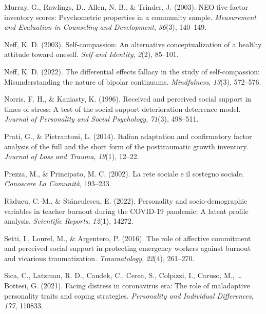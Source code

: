 \documentclass[
  man]{apa6}
\newlength{\cslhangindent}
\newlength{\cslentryspacingunit} %
\newenvironment{CSLReferences}[2] %
 {%
  \setlength{\parindent}{0pt}
  \ifodd #1
  \let\oldpar\par
  \def\par{\hangindent=\cslhangindent\oldpar}
  \fi
  \setlength{\parskip}{#2\cslentryspacingunit}
 }%
 {}
\begin{document}
\begin{CSLReferences}{1}{0}
\leavevmode{}%
Murray, G., Rawlings, D., Allen, N. B., \& Trinder, J. (2003). NEO five-factor inventory scores: Psychometric properties in a community sample. \emph{Measurement and Evaluation in Counseling and Development}, \emph{36}(3), 140--149.

\leavevmode{}%
Neff, K. D. (2003). Self-compassion: An alternative conceptualization of a healthy attitude toward oneself. \emph{Self and Identity}, \emph{2}(2), 85--101.

\leavevmode{}%
Neff, K. D. (2022). The differential effects fallacy in the study of self-compassion: Misunderstanding the nature of bipolar continuums. \emph{Mindfulness}, \emph{13}(3), 572--576.

\leavevmode{}%
Norris, F. H., \& Kaniasty, K. (1996). Received and perceived social support in times of stress: A test of the social support deterioration deterrence model. \emph{Journal of Personality and Social Psychology}, \emph{71}(3), 498--511.

\leavevmode{}%
Prati, G., \& Pietrantoni, L. (2014). Italian adaptation and confirmatory factor analysis of the full and the short form of the posttraumatic growth inventory. \emph{Journal of Loss and Trauma}, \emph{19}(1), 12--22.

\leavevmode{}%
Prezza, M., \& Principato, M. C. (2002). La rete sociale e il sostegno sociale. \emph{Conoscere La Comunit{à}}, 193--233.

\leavevmode{}%
Răducu, C.-M., \& Stănculescu, E. (2022). Personality and socio-demographic variables in teacher burnout during the COVID-19 pandemic: A latent profile analysis. \emph{Scientific Reports}, \emph{12}(1), 14272.

\leavevmode{}%
Setti, I., Lourel, M., \& Argentero, P. (2016). The role of affective commitment and perceived social support in protecting emergency workers against burnout and vicarious traumatization. \emph{Traumatology}, \emph{22}(4), 261--270.

\leavevmode{}%
Sica, C., Latzman, R. D., Caudek, C., Cerea, S., Colpizzi, I., Caruso, M., \ldots{} Bottesi, G. (2021). Facing distress in coronavirus era: The role of maladaptive personality traits and coping strategies. \emph{Personality and Individual Differences}, \emph{177}, 110833.


\end{CSLReferences}
\end{document}
